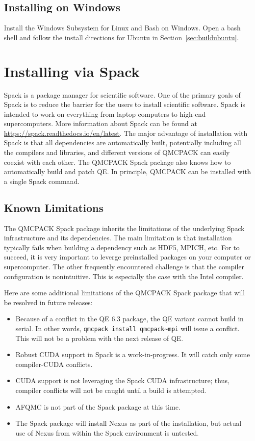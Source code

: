 \subsection{Installing on Windows}
Install the Windows Subsystem for Linux and Bash on Windows.
Open a bash shell and follow the install directions for Ubuntu in Section~\ref{sec:buildubuntu}.

\section{Installing via Spack}
Spack is a package manager for scientific software.
One of the primary goals of Spack is to reduce the barrier for the users to install scientific
software. Spack is intended to work on everything from laptop
computers to high-end supercomputers. More information about Spack can
be found at \url{https://spack.readthedocs.io/en/latest}. The major
advantage of installation with Spack is that all dependencies are
automatically built, potentially including all the compilers and libraries, and
different versions of QMCPACK can easily coexist with each other.
The QMCPACK Spack package also knows how to automatically build
and patch QE. In principle, QMCPACK can be installed with
a single Spack command.

\subsection{Known Limitations}
The QMCPACK Spack package inherits the limitations of the underlying
Spack infrastructure and its dependencies. The main limitation is that installation typically fails when building a
dependency such as HDF5, MPICH, etc. For
 to succeed, it is very important to
leverge preinstalled packages on your computer or supercomputer. The
other frequently encountered challenge is that the compiler configuration
is nonintuitive.  This is especially the case with the Intel
compiler.

Here are some additional limitations of the QMCPACK Spack package that
will be resolved in future releases:
\begin{itemize}
\item Because of a conflict in the QE 6.3 package, the QE variant cannot build
  in serial. In other words, \verb|qmcpack install qmcpack~mpi| will issue
  a conflict.  This will not be a problem with the next release of QE.

\item Robust CUDA support in Spack is a work-in-progress.  It will
  catch only some compiler-CUDA conflicts.
\item CUDA support is not leveraging the Spack CUDA infrastructure;
  thus, compiler conflicts will not be caught until a build is attempted.
\item AFQMC is not part of the Spack package at this time.
\item The Spack package will install Nexus as part of the
  installation, but actual use of Nexus from within the Spack
  environment is untested.
\end{itemize}

